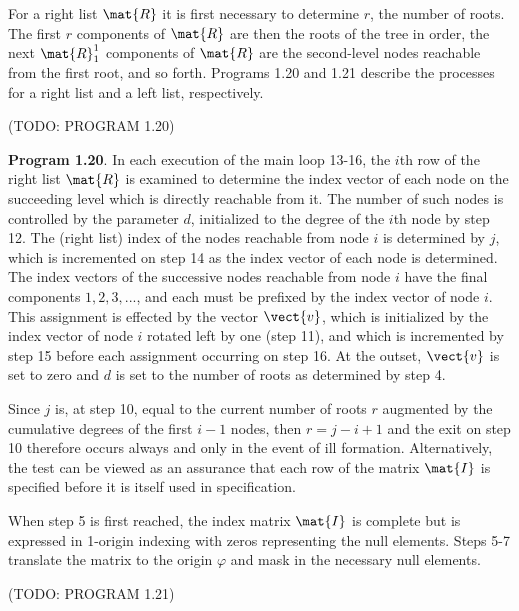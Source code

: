 \par For a right list $\mat{R}$ it is first necessary to determine $r$, the number of roots. The first $r$ components of $\mat{R}$ are then the roots of the tree in order, the next $\mat{R}_1^1$ components of $\mat{R}$ are the second-level nodes reachable from the first root, and so forth. Programs 1.20 and 1.21 describe the processes for a right list and a left list, respectively.

\par (TODO: PROGRAM 1.20)

\par \textbf{Program 1.20}. In each execution of the main loop 13-16, the $i$th row of the right list $\mat{R}$ is examined to determine the index vector of each node on the succeeding level which is directly reachable from it. The number of such nodes is controlled by the parameter $d$, initialized to the degree of the $i$th node by step 12. The (right list) index of the nodes reachable from node $i$ is determined by $j$, which is incremented on step 14 as the index vector of each node is determined. The index vectors of the successive nodes reachable from node $i$ have the final components $1, 2, 3, ...$, and each must be prefixed by the index vector of node $i$. This assignment is effected by the vector $\vect{v}$, which is initialized by the index vector of node $i$ rotated left by one (step 11), and which is incremented by step 15 before each assignment occurring on step 16. At the outset, $\vect{v}$ is set to zero and $d$ is set to the number of roots as determined by step 4.

\par Since $j$ is, at step 10, equal to the current number of roots $r$ augmented by the cumulative degrees of the first $i - 1$ nodes, then $r = j - i + 1$ and the exit on step 10 therefore occurs always and only in the event of ill formation. Alternatively, the test can be viewed as an assurance that each row of the matrix $\mat{I}$ is specified before it is itself used in specification.

\par When step 5 is first reached, the index matrix $\mat{I}$ is complete but is expressed in 1-origin indexing with zeros representing the null elements. Steps 5-7 translate the matrix to the origin $φ$ and mask in the necessary null elements.


\par (TODO: PROGRAM 1.21)

